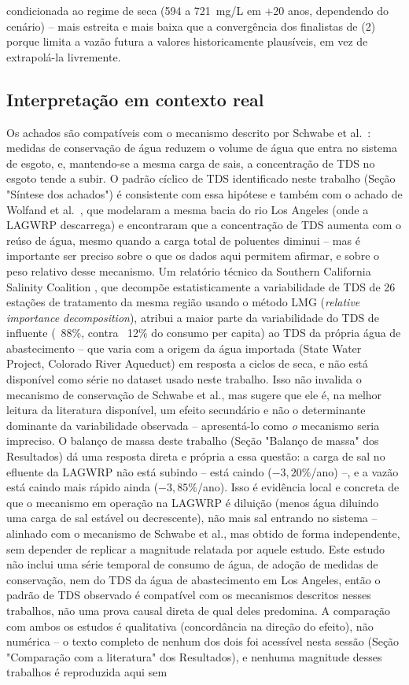condicionada ao regime de seca (594 a 721~mg/L em +20 anos, dependendo do cenário) -- mais estreita e mais baixa que a convergência dos finalistas de (2) porque limita a vazão futura a valores historicamente plausíveis, em vez de extrapolá-la livremente.

\subsection{Interpretação em contexto real}

Os achados são compatíveis com o mecanismo descrito por Schwabe et al.\ \cite{schwabe2020unintended}: medidas de conservação de água reduzem o volume de água que entra no sistema de esgoto, e, mantendo-se a mesma carga de sais, a concentração de TDS no esgoto tende a subir. O padrão cíclico de TDS identificado neste trabalho (Seção "Síntese dos achados") é consistente com essa hipótese e também com o achado de Wolfand et al.\ \cite{wolfand2022dilution}, que modelaram a mesma bacia do rio Los Angeles (onde a LAGWRP descarrega) e encontraram que a concentração de TDS aumenta com o reúso de água, mesmo quando a carga total de poluentes diminui -- mas é importante ser preciso sobre o que os dados aqui permitem afirmar, e sobre o peso relativo desse mecanismo. Um relatório técnico da Southern California Salinity Coalition \cite{scsc2018tds}, que decompõe estatisticamente a variabilidade de TDS de 26 estações de tratamento da mesma região usando o método LMG (\textit{relative importance decomposition}), atribui a maior parte da variabilidade do TDS de influente (~88\%, contra ~12\% do consumo per capita) ao TDS da própria água de abastecimento -- que varia com a origem da água importada (State Water Project, Colorado River Aqueduct) em resposta a ciclos de seca, e não está disponível como série no dataset usado neste trabalho. Isso não invalida o mecanismo de conservação de Schwabe et al., mas sugere que ele é, na melhor leitura da literatura disponível, um efeito secundário e não o determinante dominante da variabilidade observada -- apresentá-lo como \textit{o} mecanismo seria impreciso. O balanço de massa deste trabalho (Seção "Balanço de massa" dos Resultados) dá uma resposta direta e própria a essa questão: a carga de sal no efluente da LAGWRP não está subindo -- está caindo ($-3{,}20\%$/ano) --, e a vazão está caindo mais rápido ainda ($-3{,}85\%$/ano). Isso é evidência local e concreta de que o mecanismo em operação na LAGWRP é diluição (menos água diluindo uma carga de sal estável ou decrescente), não mais sal entrando no sistema -- alinhado com o mecanismo de Schwabe et al., mas obtido de forma independente, sem depender de replicar a magnitude relatada por aquele estudo. Este estudo não inclui uma série temporal de consumo de água, de adoção de medidas de conservação, nem do TDS da água de abastecimento em Los Angeles, então o padrão de TDS observado é compatível com os mecanismos descritos nesses trabalhos, não uma prova causal direta de qual deles predomina. A comparação com ambos os estudos é qualitativa (concordância na direção do efeito), não numérica -- o texto completo de nenhum dos dois foi acessível nesta sessão (Seção "Comparação com a literatura" dos Resultados), e nenhuma magnitude desses trabalhos é reproduzida aqui sem 